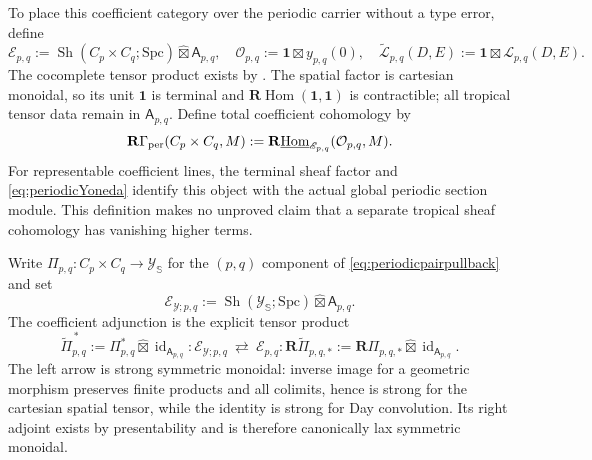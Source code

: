 \documentclass[11pt]{amsart}
\theoremstyle{definition}
\theoremstyle{remark}
\begin{document}
To place this coefficient category over the periodic carrier without a
type error, define
\begin{equation}\label{eq:periodicCoefficientTopos}
 \mathscr E_{p,q}:=\operatorname{Sh}(C_p\times C_q;\mathrm{Spc})
 \widehat\boxtimes\mathsf A_{p,q},\quad
 \mathcal O_{p,q}:=\mathbf1\boxtimes y_{p,q}(0),\quad
 \widetilde{\mathcal L}_{p,q}(D,E):=
 \mathbf1\boxtimes\mathcal L_{p,q}(D,E).
\end{equation}
The cocomplete tensor product exists by
\cite[Proposition~4.8.1.17]{LurieHA}.  The spatial factor is cartesian
monoidal, so its unit $\mathbf1$ is terminal and
$\mathbf R\!\operatorname{Hom}(\mathbf1,\mathbf1)$ is contractible; all
tropical tensor data remain in $\mathsf A_{p,q}$.  Define total coefficient
cohomology by
\begin{equation}\label{eq:periodicTotalCohomologyDefinition}
 \mathbf R\Gamma_{\rm per}(C_p\times C_q,M):=
 \mathbf R\underline{\operatorname{Hom}}_{\mathscr E_{p,q}}
 (\mathcal O_{p,q},M).
\end{equation}
For representable coefficient lines, the terminal sheaf factor and
\eqref{eq:periodicYoneda} identify this object with the actual global
periodic section module.  This definition makes no unproved
claim that a separate tropical sheaf cohomology has vanishing higher terms.

Write $\Pi_{p,q}:C_p\times C_q\to\mathscr Y_{\mathbb S}$ for the
$(p,q)$ component of \eqref{eq:periodicpairpullback} and set
\[
 \mathscr E_{\mathscr Y;p,q}:=
 \operatorname{Sh}(\mathscr Y_{\mathbb S};\mathrm{Spc})
 \widehat\boxtimes\mathsf A_{p,q}.
\]
The coefficient adjunction is the explicit tensor product
\begin{equation}\label{eq:periodicComponentAdjunction}
 \widetilde\Pi_{p,q}^{\,*}:=\Pi_{p,q}^*\widehat\boxtimes
 \operatorname{id}_{\mathsf A_{p,q}} :
 \mathscr E_{\mathscr Y;p,q}
 \ \rightleftarrows\
 \mathscr E_{p,q} :
 \mathbf R\widetilde\Pi_{p,q,*}:=
 \mathbf R\Pi_{p,q,*}\widehat\boxtimes
 \operatorname{id}_{\mathsf A_{p,q}}.
\end{equation}
The left arrow is strong symmetric monoidal: inverse image for a geometric
morphism preserves finite products and all colimits, hence is strong for the
cartesian spatial tensor, while the identity is strong for Day convolution.
Its right adjoint exists by presentability and is therefore canonically lax
symmetric monoidal.
\end{document}
